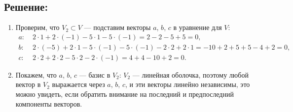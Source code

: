 \documentclass[12pt]{article}
\begin{document}
    \subsection*{Решение:}
    \begin{enumerate}
        \item
        Проверим, что $V_2 \subset V$ --- подставим векторы $a$, $b$, $c$ в уравнение для $V$:
        \begin{align*}
            a: & \; 2 \cdot 1 + 2 \cdot (-1) - 5 \cdot 1 - 5 \cdot (-1) = 2 - 2 - 5 + 5 = 0, \\
            b: & \; 2 \cdot (-5) + 2 \cdot 1 - 5 \cdot (-1) - 5 \cdot (-1) - 2 \cdot 2 + 2 \cdot 1 = -10 + 2 + 5 + 5 - 4 + 2 = 0, \\
            c: & \; 2 \cdot 2 + 2 \cdot 2 - 5 \cdot 2 - 2 \cdot (-1) = 4 + 4 - 10 + 2 = 0 .
        \end{align*}

        \item
        Покажем, что $a$, $b$, $c$ --- базис в $V_2$: $V_2$ --- линейная оболочка, поэтому любой вектор в $V_2$ выражается через $a$, $b$, $c$, и эти векторы линейно независимы,
        это можно увидеть, если обратить внимание на последний и предпоследний компоненты векторов.


\end{enumerate}
\end{document}
